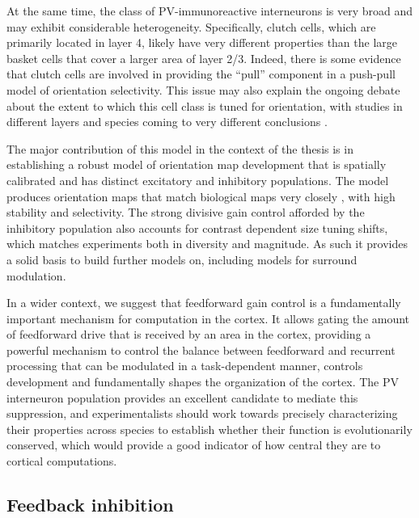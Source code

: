 At the same time, the class of PV-immunoreactive interneurons is very
broad and may exhibit considerable heterogeneity. Specifically, clutch
cells, which are primarily located in layer 4, likely have very
different properties than the large basket cells that cover a larger
area of layer 2/3. Indeed, there is some evidence that clutch cells
are involved in providing the ``pull'' component in a push-pull model
of orientation selectivity. This issue may also explain the ongoing
debate about the extent to which this cell class is tuned for
orientation, with studies in different layers and species coming to
very different conclusions \citep{Cardin2007, Ma2011, Hofer2011}.

The major contribution of this model in the context of the thesis is
in establishing a robust model of orientation map development that is
spatially calibrated and has distinct excitatory and inhibitory
populations. The model produces orientation maps that match
biological maps very closely \citep{Kaschube2010, Stevens2013}, with
high stability and selectivity.  The strong divisive gain control
afforded by the inhibitory population also accounts for contrast
dependent size tuning shifts, which matches experiments both in
diversity and magnitude. As such it provides a solid basis to build
further models on, including models for surround modulation. 

In a wider context, we suggest that feedforward gain control is a
fundamentally important mechanism for computation in the cortex. It
allows gating the amount of feedforward drive that is received by an
area in the cortex, providing a powerful mechanism to control the
balance between feedforward and recurrent processing that can be
modulated in a task-dependent manner, controls development and
fundamentally shapes the organization of the cortex. The PV
interneuron population provides an excellent candidate to mediate this
suppression, and experimentalists should work towards precisely
characterizing their properties across species to establish whether
their function is evolutionarily conserved, which would provide a good
indicator of how central they are to cortical computations.

\subsection{Feedback inhibition}

